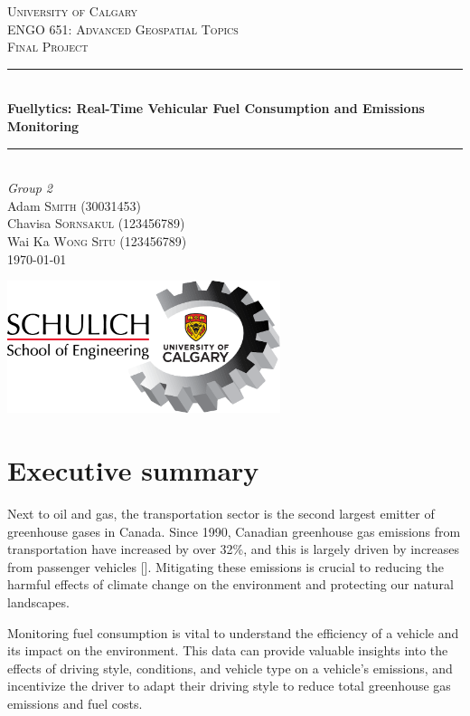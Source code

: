 \documentclass[11pt, oneside]{article}
\newcounter{refno}
\newcommand{\reflabel}[1]{\refstepcounter{refno}\label{#1}[\arabic{refno}]}  %
\begin{document}
\begin{titlepage}
	\newcommand{\HRule}{\rule{\linewidth}{0.5mm}}
	
	\center
	\textsc{\LARGE University of Calgary}\\[1.5cm]
	\textsc{\Large ENGO 651: Advanced Geospatial Topics}\\[0.5cm]
	\textsc{\large Final Project}\\[0.5cm]

	\HRule\\[0.4cm]
	{\huge\bfseries Fuellytics: Real-Time Vehicular Fuel Consumption and Emissions Monitoring}\\[0.4cm]
	\HRule\\[1.5cm]
	
	{\large\textit{Group 2}}\\
	Adam \textsc{Smith} (30031453)\\
	Chavisa \textsc{Sornsakul} (123456789)\\
	Wai Ka \textsc{Wong Situ} (123456789)\\
	
	\vfill\vfill\vfill
	{\large \today}
	
	\vfill\vfill\vfill
	\includegraphics[width=8cm,]{img/schulich.png}\\[1cm]	
\end{titlepage}

\section{Executive summary}
Next to oil and gas, the transportation sector is the second largest emitter of greenhouse gases in Canada.  Since 1990, Canadian greenhouse gas emissions from transportation have increased by over 32\%, and this is largely driven by increases from passenger vehicles \reflabel{canadaghg}.  Mitigating these emissions is crucial to reducing the harmful effects of climate change on the environment and protecting our natural landscapes.

Monitoring fuel consumption is vital to understand the efficiency of a vehicle and its impact on the environment.  This data can provide valuable insights into the effects of driving style, conditions, and vehicle type on a vehicle's emissions, and incentivize the driver to adapt their driving style to reduce total greenhouse gas emissions and fuel costs.  
\end{document}
